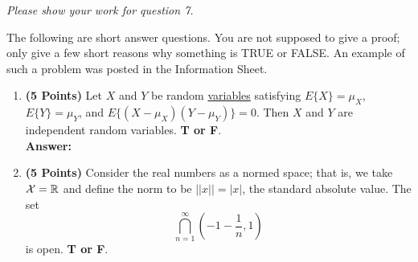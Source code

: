 \documentclass[letterpaper]{article}
\newcommand{\real}{\mathbb R}  %
\begin{document}
\newpage
\textit{Please show your work for question 7.}
\newpage


  The following are short answer questions. You are not supposed to give a proof; only give a few short reasons why something is TRUE or FALSE. An example of such a problem was posted in the Information Sheet.

\begin{enumerate}
\setlength{\itemsep}{.15in}
\renewcommand{\labelenumi}{(\alph{enumi})}
\setlength{\itemsep}{.1in}

%

\item \textbf{(5 Points)} Let $X$ and $Y$ be random \underline{variables}  satisfying $E\{X\}=\mu_X$, $E\{Y\}=\mu_Y$, and  $E\{(X-\mu_X)(Y-\mu_Y)\}=0$. Then $X$ and $Y$ are independent random variables. \textbf{ T or F}.\\

    \textbf{Answer:}

\vspace*{5cm}




\item \textbf{(5 Points)}  Consider the real numbers as a normed space; that is, we take  ${\cal X} = \real$ and define the norm to be $||x|| = |x|$, the standard absolute value. The set $$ \bigcap\limits_{n=1}^{\infty} (-1- \frac{1}{n}, 1)
    $$ is open. \textbf{ T or F}.\\


\end{enumerate}
\end{document}
